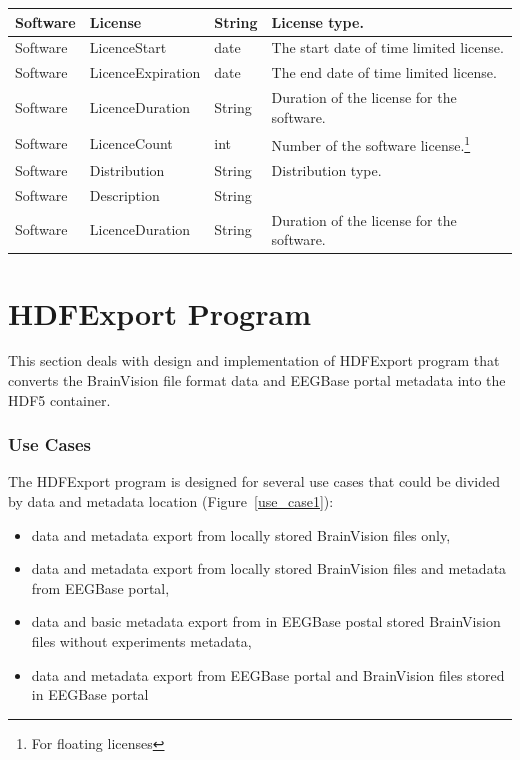 \documentclass[conference]{IEEEtran}
\begin{document}
\begin{savenotes}
\begin{table}
\begin{tabular}{ | l | l | l | p{3cm} |}
 	\hline
 	Software & License & String & License type.\\
 	\hline
 	Software & LicenceStart & date & The start date of time limited license.\\ 		\hline
 	Software & LicenceExpiration & date & The end date of time limited license.\\ 		\hline
 	Software & LicenceDuration & String & Duration of the license for the software.\\ 		\hline
 	Software & LicenceCount & int & Number of the software license.\footnote{For floating licenses}\\ 		\hline
 	Software & Distribution & String & Distribution type.\\ 		\hline
 	Software & Description & String & \\ 		\hline
 	Software & LicenceDuration & String & Duration of the license for the software.\\ 		\hline
 \end{tabular}

 \end{table}
 \end{savenotes}

\section{HDFExport Program}

This section deals with design and implementation of HDFExport program that converts the BrainVision file format data and EEGBase portal metadata into the HDF5 container.

\subsubsection {Use Cases}
The HDFExport program is designed for several use cases that could be divided by data and metadata location (Figure~\ref{use_case1}):
\begin{itemize}
	\item data and metadata export from locally stored BrainVision files only,
	\item data and metadata export from locally stored BrainVision files and metadata from EEGBase portal,
	\item data and basic metadata export from in EEGBase postal stored BrainVision files without experiments metadata,
	\item data and metadata export from EEGBase portal and BrainVision files stored in EEGBase portal
\end{itemize}
\end{document}
